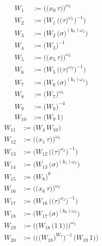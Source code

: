 \begin{align*}
W_{1} &:= \bigl(\bigl(x_{0}\,\tau\bigr)\bigr)^{\omega_2} \\
W_{2} &:= \bigl(W_{1}\,\bigl(\bigl(\tau\bigr)^{\omega_2}\bigr)^{-1}\bigr) \\
W_{3} &:= \bigl(W_{2}\,\bigl(\sigma\bigr)^{(\mathrm{k}_{0})\omega_2}\bigr) \\
W_{4} &:= \bigl(W_{3}\bigr)^{-1} \\
W_{5} &:= \bigl(\bigl(x_{5}\,\tau\bigr)\bigr)^{\omega_2} \\
W_{6} &:= \bigl(W_{5}\,\bigl(\bigl(\tau\bigr)^{\omega_2}\bigr)^{-1}\bigr) \\
W_{7} &:= \bigl(W_{6}\,\bigl(\sigma\bigr)^{(\mathrm{k}_{5})\omega_2}\bigr) \\
W_{8} &:= \bigl(W_{7}\bigr)^{\omega_2} \\
W_{9} &:= \bigl(W_{8}\bigr)^{-4} \\
W_{10} &:= \bigl(W_{9}\,1\bigr)
\end{align*}
\begin{align*}
W_{11} &:= \bigl(W_{4}\,W_{10}\bigr) \\
W_{12} &:= \bigl(\bigl(x_{1}\,\tau\bigr)\bigr)^{\omega_2} \\
W_{13} &:= \bigl(W_{12}\,\bigl(\bigl(\tau\bigr)^{\omega_2}\bigr)^{-1}\bigr) \\
W_{14} &:= \bigl(W_{13}\,\bigl(\sigma\bigr)^{(\mathrm{k}_{1})\omega_2}\bigr) \\
W_{15} &:= \bigl(W_{8}\bigr)^{8} \\
W_{16} &:= \bigl(\bigl(x_{6}\,\tau\bigr)\bigr)^{\omega_2} \\
W_{17} &:= \bigl(W_{16}\,\bigl(\bigl(\tau\bigr)^{\omega_2}\bigr)^{-1}\bigr) \\
W_{18} &:= \bigl(W_{17}\,\bigl(\sigma\bigr)^{(\mathrm{k}_{6})\omega_2}\bigr) \\
W_{19} &:= \bigl(\bigl(W_{18}\,\bigl(1\,1\bigr)\bigr)\bigr)^{\omega_2} \\
W_{20} &:= \bigl(\bigl(\bigl(W_{18}\bigr)^{W_{7}}\bigr)^{-1}\,\bigl(W_{19}\,1\bigr)\bigr)
\end{align*}
